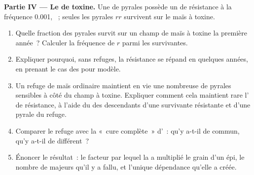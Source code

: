 \begin{problem}
\medskip
\noindent\textbf{Partie IV --- Le  de toxine.}
Une  de pyrales possède un  de résistance à la
fréquence 0.001, ~; seules les pyrales $rr$ survivent sur le
maïs à toxine.
\begin{enumerate}[resume]
  \item Quelle fraction des pyrales survit sur un champ de maïs à
        toxine la première année~? Calculer la fréquence de $r$ parmi
        les survivantes.
  \item Expliquer pourquoi, sans refuges, la résistance se répand en
        quelques années, en prenant le cas des  pour
        modèle.
  \item Un refuge de maïs ordinaire maintient en vie une 
        nombreuse de pyrales sensibles à côté du champ à toxine.
        Expliquer comment cela maintient rare l' de résistance,
        à l'aide du  des descendants d'une survivante
        résistante et d'une pyrale du refuge.
  \item Comparer le refuge avec la «~cure complète~» d'~:
        qu'y a-t-il de commun, qu'y a-t-il de différent~?
  \item Énoncer le résultat~: le facteur par lequel la  a
        multiplié le grain d'un épi, le nombre de  majeurs qu'il
        y a fallu, et l'unique dépendance qu'elle a créée.
\end{enumerate}
\end{problem}
